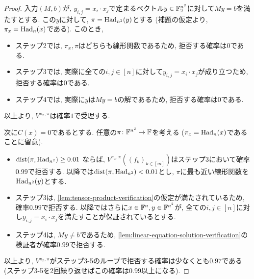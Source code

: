 \begin{proof}
    入力$(M,b)$が, $y_{i,j}=x_i\cdot x_j$で定まるベクトル$y\in\mathbb{F}_2^{n^2}$に対して$My=b$を満たすとする.
    この$y$に対して, $\pi=\mathrm{Had}_{n^2}(y)$とする (補題の仮定より, $\pi_x=\mathrm{Had}_n(x)$である).
    このとき, 
    \begin{itemize}
      \item ステップ2では, $\pi_x,\pi$はどちらも線形関数であるため, 拒否する確率は$0$である.
      \item ステップ3では, 実際に全ての$i,j\in [n]$に対して$y_{i,j}=x_i\cdot x_j$が成り立つため, 拒否する確率は$0$である.
      \item ステップ4では, 実際に$y$は$My=b$の解であるため, 拒否する確率は$0$である.
    \end{itemize}
    以上より, $V^{\pi_x,\pi}$は確率$1$で受理する.

    次に$C(x)=0$であるとする.
    任意の$\pi\colon\mathbb{F}^{n^2}\to\mathbb{F}$を考える ($\pi_x=\mathrm{Had}_n(x)$であることに留意).

    \begin{itemize}
      \item $\mathrm{dist}(\pi,\mathrm{Had}_{n^2})\ge 0.01$ ならば, $V^{\pi_x,\pi}((f_k)_{k\in[m]})$はステップ3において確率$0.99$で拒否する. 以降では$\mathrm{dist}(\pi,\mathrm{Had}_{n^2}) < 0.01$とし, $\pi$に最も近い線形関数を$\mathrm{Had}_{n^2}(y)$とする.
      \item ステップ3は, \cref{lem:tensor-product-verification}の仮定が満たされているため, 確率$0.99$で拒否する. 以降ではさらに$x\in\mathbb{F}^n,y\in\mathbb{F}^{n^2}$が, 全ての$i,j\in [n]$に対し$y_{i,j}=x_i\cdot x_j$を満たすことが保証されているとする.
      \item ステップ4は, $My\ne b$であるため, \cref{lem:linear-equation-solution-verification}の検証者が確率$0.99$で拒否する.
    \end{itemize}
    以上より, $V^{\pi_x,\pi}$がステップ3-5のループで拒否する確率は少なくとも$0.97$である (ステップ3-5を2回繰り返せばこの確率は$0.99$以上になる).
  \end{proof}
    
